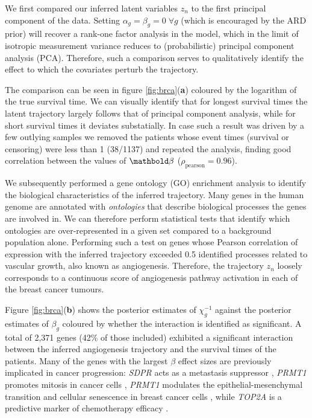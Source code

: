 We first compared our inferred latent variables $z_n$ to the first principal component of the data. Setting $\alpha_g = \beta_g = 0\; \forall g$ (which is encouraged by the ARD prior) will recover a rank-one factor analysis in the model, which in the limit of isotropic measurement variance reduces to (probabilistic) principal component analysis (PCA). Therefore, such a comparison serves to qualitatively identify the effect to which the covariates perturb the trajectory.

The comparison can be seen in figure \ref{fig:brca}(\textbf{a}) coloured by the logarithm of the true survival time. We can visually identify that for longest survival times the latent trajectory largely follows that of principal component analysis, while for short survival times it deviates substatially. In case such a result was driven by a few outlying samples we removed the patients whose event times (survival or censoring) were less than 1 (38/1137) and repeated the analysis, finding good correlation between the values of $\mbbeta$ ($\rho_{\text{pearson}} = 0.96$).

We subsequently performed a gene ontology (GO) enrichment analysis to identify the biological characteristics of the inferred trajectory. Many genes in the human genome are annotated with \emph{ontologies} that describe biological processes the genes are involved in. We can therefore perform statistical tests \citep{young2010gene} that identify which ontologies are over-represented in a given set compared to a background population alone. Performing such a test on genes whose Pearson correlation of expression with the inferred trajectory exceeded 0.5 identified processes related to vascular growth, also known as angiogenesis. Therefore, the trajectory $z_n$ loosely corresponds to a continuous score of angiogenesis pathway activation in each of the breast cancer tumours.


Figure \ref{fig:brca}(\textbf{b}) shows the posterior estimates of $\chi_g^{-1}$ against the posterior estimates of $\beta_g$ coloured by whether the interaction is identified as significant. %
A total of 2,371 genes (42\% of those included) exhibited a significant interaction between the inferred angiogenesis trajectory and the survival times of the patients. Many of the genes with the largest $\beta$ effect sizes are previously implicated in cancer progression: \emph{SDPR} acts as a metastasis suppressor \citep{ozturk2016sdpr}, \emph{PRMT1} promotes mitosis in
cancer cells \citep{deng2015prmt1}, \emph{PRMT1} modulates the epithelial-mesenchymal transition and cellular senescence in breast cancer cells \citep{gao2016dual}, while \emph{TOP2A} is a predictive marker of chemotherapy efficacy \citep{wang2012top2a}.

